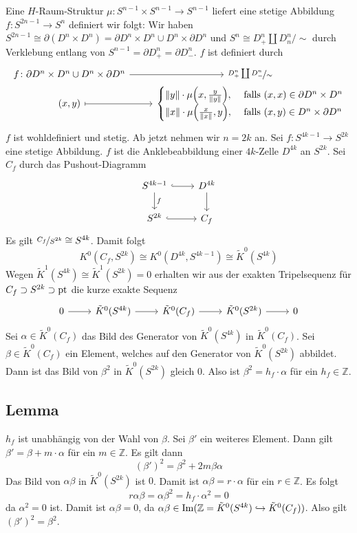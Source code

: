 Eine $H$-Raum-Struktur $\mu \colon S^{n-1} \times S^{n-1} \to S^{n-1}$ liefert eine stetige Abbildung $f \colon S^{2n-1} \to S^n$ definiert wir folgt: Wir haben 
$S^{2n-1} \cong \partial (D^n \times D^n) = \partial D^n \times D^n \cup D^n \times \partial D^n$ und  $S^n \cong D^n_+ \coprod D^n_n /\sim$ durch Verklebung
entlang von $S^{n-1} = \partial D^n_+ = \partial D^n_-$. $f$ ist definiert durch
\[
	\begin{tikzcd}[ampersand replacement=\&,row sep=0cm]
		f \colon \partial D^n \times D^n \cup D^n \times \partial D^n \rar \& \nicefrac{D^n_+ \coprod D^n_-}{\sim} \\
		(x,y) \rar[mapsto] \&  {\begin{cases}
			\norm{y} \cdot \mu \enbrace*{x, \frac{y}{\norm{y} } }  , &\text{ falls } (x,x) \in \partial D^n  \times D^n\\
			\norm{x} \cdot \mu \enbrace*{\frac{x}{\norm{x} },y }  , &\text{ falls } (x,y) \in D^n \times \partial D^n
		\end{cases}}
	\end{tikzcd}
\]
$f$ ist wohldefiniert und stetig. Ab jetzt nehmen wir $n=2k$ an. Sei $f \colon S^{4k-1} \to S^{2k}$ eine stetige Abbildung. $f$ ist die Anklebeabbildung einer $4k$-Zelle
$D^{4k}$ an $S^{2k}$. Sei $C_f$ durch das Pushout-Diagramm
\[
	\begin{tikzcd}
		S^{4k-1} \rar[hook] \dar["f"] & D^{4k} \dar\\
		S^{2k} \rar[hook] &C_f
	\end{tikzcd}
\]
Es gilt $\nicefrac{C_f}{S^{2k}} \cong S^{4k}$. Damit folgt
\[
	K^0(C_f,S^{2k}) \cong K^0(D^{4k}, S^{4k-1}) \cong \tilde{K}^0(S^{4k})
\]
Wegen $\tilde{K}^1(S^{4k}) \cong \tilde{K}^1(S^{2k}) =0$ erhalten wir aus der exakten Tripelsequenz für $C_f \supset S^{2k} \supset \mathrm{pt}$ die kurze exakte Sequenz
\[
	\begin{tikzcd}
		0 \rar & \tilde{K}^0(S^{4k}) \rar & \tilde{K}^0(C_f) \rar & \tilde{K}^0(S^{2k}) \rar & 0
	\end{tikzcd}
\]
Sei $\alpha \in \tilde{K}^0(C_f)$ das Bild des Generator von $\tilde{K}^0(S^{4k})$ in $\tilde{K}^0(C_f)$. Sei $\beta \in \tilde{K}^0(C_f)$ ein Element, welches auf den
Generator von $\tilde{K}^0(S^{2k})$ abbildet. Dann ist das Bild von $\beta^2$ in $\tilde{K}^0(S^{2k})$ gleich $0$. Also ist $\beta^2= h_f \cdot \alpha$ für ein 
$h_f \in \mathds{Z}$.

\subsection{Lemma} %
\label{sub:45}
$h_f$ ist unabhängig von der Wahl von $\beta$.
Sei $\beta'$ ein weiteres Element. Dann gilt $\beta' = \beta + m \cdot \alpha$ für ein $m \in \mathds{Z}$. Es gilt dann
\[
	(\beta')^2 = \beta^2 + 2m \beta \alpha
\]
Das Bild von $\alpha \beta$ in $\tilde{K}^0(S^{2k})$ ist $0$. Damit ist $\alpha \beta= r \cdot \alpha$ für ein $r \in \mathds{Z}$. Es folgt
\[
	r \alpha \beta = \alpha \beta^2 = h_f \cdot \alpha^2=0
\]
da $\alpha^2=0$ ist.  Damit ist $\alpha \beta=0$, da $\alpha \beta \in \operatorname{Im} (\mathbb{Z}= \tilde{K}^0(S^{4k}) \hookrightarrow \tilde{K}^0(C_f))$. Also gilt 
$(\beta')^2=\beta^2$. \bewende

